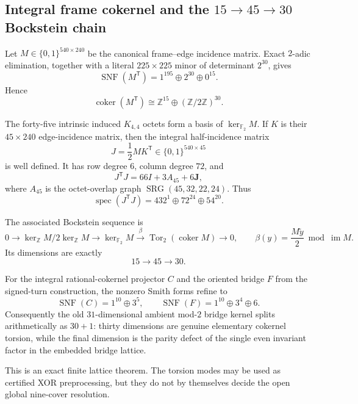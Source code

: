 \subsection{Integral frame cokernel and the \texorpdfstring{$15\to45\to30$}{15 to 45 to 30} Bockstein chain}

Let $M\in\{0,1\}^{540\times240}$ be the canonical frame--edge
incidence matrix.  Exact $2$-adic elimination, together with a literal
$225\times225$ minor of determinant $2^{30}$, gives
\[
 \operatorname{SNF}(M^{\mathsf T})
 =1^{195}\oplus2^{30}\oplus0^{15}.
\]
Hence
\[
 \operatorname{coker}(M^{\mathsf T})
 \cong \mathbb Z^{15}\oplus(\mathbb Z/2\mathbb Z)^{30}.
\]

The forty-five intrinsic induced $K_{4,4}$ octets form a basis of
$\ker_{\mathbb F_2}M$.  If $K$ is their $45\times240$ edge-incidence
matrix, then the integral half-incidence matrix
\[
 J=\frac12 MK^{\mathsf T}\in\{0,1\}^{540\times45}
\]
is well defined.  It has row degree $6$, column degree $72$, and
\[
 J^{\mathsf T}J=66I+3A_{45}+6\mathbf J,
\]
where $A_{45}$ is the octet-overlap graph
$\operatorname{SRG}(45,32,22,24)$.  Thus
\[
 \operatorname{spec}(J^{\mathsf T}J)
 =432^1\oplus72^{24}\oplus54^{20}.
\]

The associated Bockstein sequence is
\[
0\longrightarrow
\ker_{\mathbb Z}M/2\ker_{\mathbb Z}M
\longrightarrow
\ker_{\mathbb F_2}M
\xrightarrow{\ \beta\ }
\operatorname{Tor}_2(\operatorname{coker}M)
\longrightarrow0,
\qquad
\beta(y)=\frac{M\widetilde y}{2}\bmod\operatorname{im}M.
\]
Its dimensions are exactly
\[
 15\longrightarrow45\longrightarrow30.
\]

For the integral rational-cokernel projector $C$ and the oriented bridge $F$
from the signed-turn construction, the nonzero Smith forms refine to
\[
 \operatorname{SNF}(C)=1^{10}\oplus3^5,
 \qquad
 \operatorname{SNF}(F)=1^{10}\oplus3^4\oplus6.
\]
Consequently the old $31$-dimensional ambient mod-$2$ bridge kernel splits
arithmetically as $30+1$: thirty dimensions are genuine elementary
cokernel torsion, while the final dimension is the parity defect of the
single even invariant factor in the embedded bridge lattice.

This is an exact finite lattice theorem.  The torsion modes may be used as
certified XOR preprocessing, but they do not by themselves decide the open
global nine-cover resolution.
